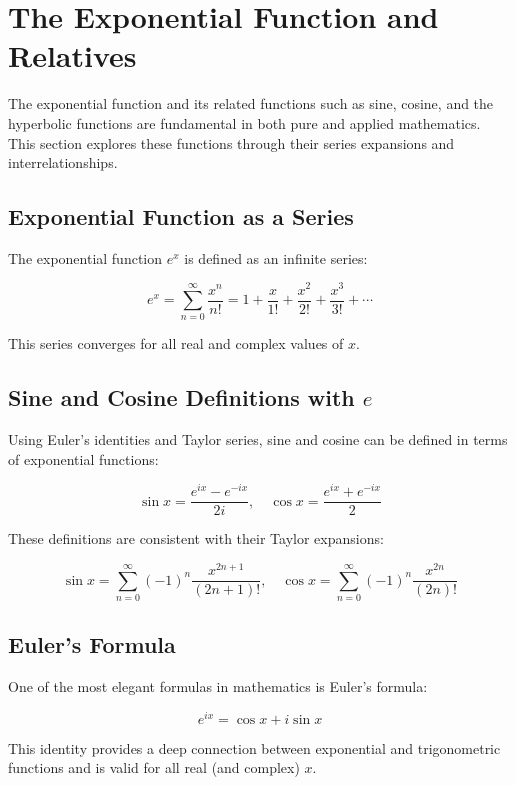 \newpage
\section{The Exponential Function and Relatives}

The exponential function and its related functions such as sine, cosine, and the hyperbolic functions 
are fundamental in both pure and applied mathematics. This section explores these functions through their 
series expansions and interrelationships.

\subsection{Exponential Function as a Series}

The exponential function \(e^x\) is defined as an infinite series:

\[
    e^x = \sum_{n=0}^{\infty} \frac{x^n}{n!}
    = 1 + \frac{x}{1!} + \frac{x^2}{2!} + \frac{x^3}{3!} + \cdots
\]

This series converges for all real and complex values of \(x\).

\subsection{Sine and Cosine Definitions with \texorpdfstring{\(e\)}{e}}

Using Euler's identities and Taylor series, sine and cosine can be defined in terms of exponential 
functions:

\[
    \sin x = \frac{e^{ix} - e^{-ix}}{2i}, \quad
    \cos x = \frac{e^{ix} + e^{-ix}}{2}
\]

These definitions are consistent with their Taylor expansions:

\[
    \sin x = \sum_{n=0}^{\infty} {(-1)}^n \frac{x^{2n+1}}{(2n+1)!}, \quad
    \cos x = \sum_{n=0}^{\infty} {(-1)}^n \frac{x^{2n}}{(2n)!}
\]

\subsection{Euler's Formula}

One of the most elegant formulas in mathematics is Euler’s formula:

\[
    e^{ix} = \cos x + i\sin x
\]

This identity provides a deep connection between exponential and trigonometric functions and is valid 
for all real (and complex) \(x\).
\vspace{\baselineskip}

